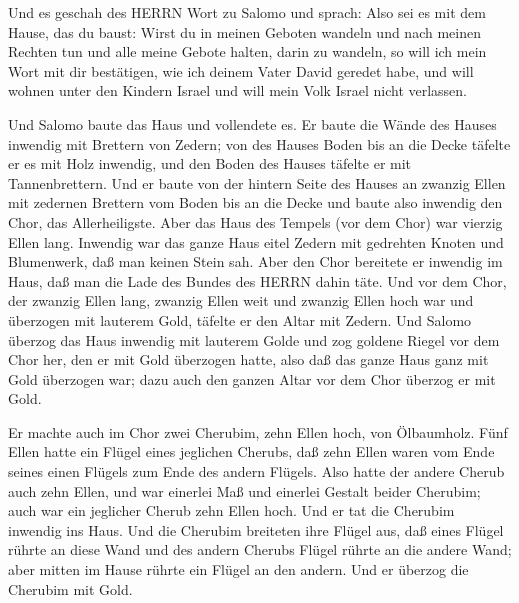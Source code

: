  Und es geschah des HERRN Wort zu Salomo und sprach:
 Also sei es mit dem Hause, das du baust: Wirst du in
meinen Geboten wandeln und nach meinen Rechten tun und alle meine Gebote
halten, darin zu wandeln, so will ich mein Wort mit dir bestätigen, wie
ich deinem Vater David geredet habe,  und will wohnen unter
den Kindern Israel und will mein Volk Israel nicht verlassen.

 Und Salomo baute das Haus und vollendete es. 
Er baute die Wände des Hauses inwendig mit Brettern von Zedern; von des
Hauses Boden bis an die Decke täfelte er es mit Holz inwendig, und den
Boden des Hauses täfelte er mit Tannenbrettern.  Und er
baute von der hintern Seite des Hauses an zwanzig Ellen mit zedernen
Brettern vom Boden bis an die Decke und baute also inwendig den Chor,
das Allerheiligste.  Aber das Haus des Tempels (vor dem
Chor) war vierzig Ellen lang.  Inwendig war das ganze Haus
eitel Zedern mit gedrehten Knoten und Blumenwerk, daß man keinen Stein
sah.  Aber den Chor bereitete er inwendig im Haus, daß man
die Lade des Bundes des HERRN dahin täte.  Und vor dem
Chor, der zwanzig Ellen lang, zwanzig Ellen weit und zwanzig Ellen hoch
war und überzogen mit lauterem Gold, täfelte er den Altar mit Zedern.
 Und Salomo überzog das Haus inwendig mit lauterem Golde
und zog goldene Riegel vor dem Chor her, den er mit Gold überzogen
hatte,  also daß das ganze Haus ganz mit Gold überzogen
war; dazu auch den ganzen Altar vor dem Chor überzog er mit Gold.

 Er machte auch im Chor zwei Cherubim, zehn Ellen hoch, von
Ölbaumholz.  Fünf Ellen hatte ein Flügel eines jeglichen
Cherubs, daß zehn Ellen waren vom Ende seines einen Flügels zum Ende des
andern Flügels.  Also hatte der andere Cherub auch zehn
Ellen, und war einerlei Maß und einerlei Gestalt beider Cherubim;
 auch war ein jeglicher Cherub zehn Ellen hoch.
 Und er tat die Cherubim inwendig ins Haus. Und die
Cherubim breiteten ihre Flügel aus, daß eines Flügel rührte an diese
Wand und des andern Cherubs Flügel rührte an die andere Wand; aber
mitten im Hause rührte ein Flügel an den andern.  Und er
überzog die Cherubim mit Gold.

